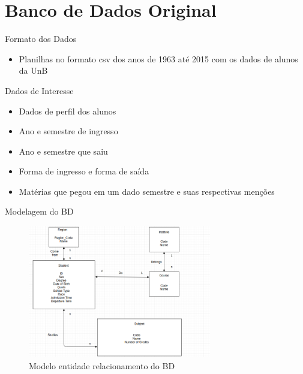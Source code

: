 \section{Banco de Dados Original}
\begin{frame}{Formato dos Dados}
    \begin{itemize}[itemsep = 5em]
        \item Planilhas no formato csv dos anos de 1963 até 2015 com os dados 
            de alunos da UnB
    \end{itemize}
\end{frame}

\begin{frame}{Dados de Interesse}
    \begin{itemize}
        \item Dados de perfil dos alunos 
        \item Ano e semestre de ingresso 
        \item Ano e semestre que saiu 
        \item Forma de ingresso e forma de saída
        \item Matérias que pegou em um dado semestre e suas respectivas menções
    \end{itemize}
\end{frame}

\begin{frame}{Modelagem do BD}
            \begin{figure}[!ht]
                \caption{Modelo entidade relacionamento do BD}
                \centering
                \includegraphics[width = 8cm]{./images/database.png}
            \end{figure}
\end{frame}
